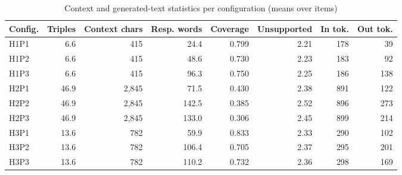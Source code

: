 \begin{table}[H]
\centering
\small
\begin{tabular}{lrrrrrrr}
\toprule
Config. & Triples & Context chars & Resp. words & Coverage & Unsupported & In tok. & Out tok. \\
\midrule
H1P1 & 6.6 & 415 & 24.4 & 0.799 & 2.21 & 178 & 39 \\
H1P2 & 6.6 & 415 & 48.6 & 0.730 & 2.23 & 183 & 92 \\
H1P3 & 6.6 & 415 & 96.3 & 0.750 & 2.25 & 186 & 138 \\
H2P1 & 46.9 & 2,845 & 71.5 & 0.430 & 2.38 & 891 & 122 \\
H2P2 & 46.9 & 2,845 & 142.5 & 0.385 & 2.52 & 896 & 273 \\
H2P3 & 46.9 & 2,845 & 133.0 & 0.306 & 2.45 & 899 & 214 \\
H3P1 & 13.6 & 782 & 59.9 & 0.833 & 2.33 & 290 & 102 \\
H3P2 & 13.6 & 782 & 106.4 & 0.705 & 2.37 & 295 & 201 \\
H3P3 & 13.6 & 782 & 110.2 & 0.732 & 2.36 & 298 & 169 \\
\bottomrule
\end{tabular}
\caption{Context and generated-text statistics per configuration (means over items)\RunTag}
\label{tab:text_stats}
\end{table}
